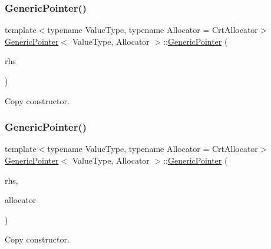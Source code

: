 \subsubsection{\texorpdfstring{Generic\+Pointer()}{GenericPointer()}\hspace{0.1cm}{\footnotesize\ttfamily [5/6]}}
{\footnotesize\ttfamily template$<$typename Value\+Type, typename Allocator = Crt\+Allocator$>$ \\
\hyperlink{classGenericPointer}{Generic\+Pointer}$<$ Value\+Type, Allocator $>$\+::\hyperlink{classGenericPointer}{Generic\+Pointer} (\begin{DoxyParamCaption}\item[{const \hyperlink{classGenericPointer}{Generic\+Pointer}$<$ Value\+Type, Allocator $>$ \&}]{rhs }\end{DoxyParamCaption})\hspace{0.3cm}{\ttfamily [inline]}}



Copy constructor. 

\mbox{\label{classGenericPointer_a4395ca3f5c646e47cc9b93d21d1660ae}} 
\subsubsection{\texorpdfstring{Generic\+Pointer()}{GenericPointer()}\hspace{0.1cm}{\footnotesize\ttfamily [6/6]}}
{\footnotesize\ttfamily template$<$typename Value\+Type, typename Allocator = Crt\+Allocator$>$ \\
\hyperlink{classGenericPointer}{Generic\+Pointer}$<$ Value\+Type, Allocator $>$\+::\hyperlink{classGenericPointer}{Generic\+Pointer} (\begin{DoxyParamCaption}\item[{const \hyperlink{classGenericPointer}{Generic\+Pointer}$<$ Value\+Type, Allocator $>$ \&}]{rhs,  }\item[{Allocator $\ast$}]{allocator }\end{DoxyParamCaption})\hspace{0.3cm}{\ttfamily [inline]}}



Copy constructor. 

\mbox{\label{classGenericPointer_acf3eb2f7c4ebf9256f638aafa17534cb}} 
